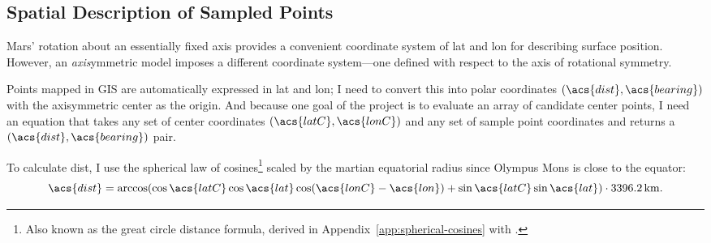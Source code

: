 
\subsection{Spatial Description of Sampled Points}

Mars' rotation about an essentially fixed axis provides a convenient coordinate system of \ac{lat} and \ac{lon} for describing surface position. However, an \emph{axis}ymmetric model imposes a different coordinate system---one defined with respect to the axis of rotational symmetry.

Points mapped in GIS are automatically expressed in \ac{lat} and \ac{lon}; I need to convert this into polar coordinates $(\acs{dist},\acs{bearing})$ with the axisymmetric center as the origin. And because one goal of the project is to evaluate an array of candidate center points, I need an equation that takes any set of center coordinates $(\acs{latC}, \acs{lonC})$ and any set of sample point coordinates and returns a $(\acs{dist},\acs{bearing})$ pair.

To calculate \acf{dist}, I use the spherical law of cosines\footnote{Also known as the great circle distance formula, derived in Appendix~\ref{app:spherical-cosines} with .} scaled by the martian equatorial radius since Olympus Mons is close to the equator:
\begin{equation}
    \acs{dist}=\arccos(\cos\acs{latC}\cos\acs{lat}\cos(\acs{lonC}-\acs{lon}) + \sin\acs{latC}\sin\acs{lat})\cdot\qty{3396.2}{\km}.
\end{equation}

